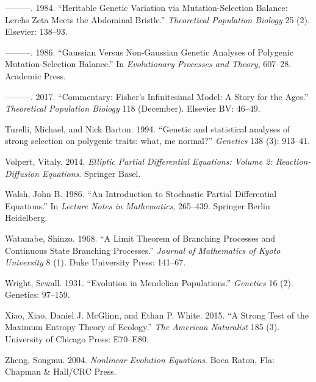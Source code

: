 \documentclass[]{article}
\begin{document}
\leavevmode\hypertarget{ref-Turelli1984}{}%
---------. 1984. ``Heritable Genetic Variation via Mutation-Selection
Balance: Lerchs Zeta Meets the Abdominal Bristle.'' \emph{Theoretical
Population Biology} 25 (2). Elsevier: 138--93.

\leavevmode\hypertarget{ref-Turelli1986}{}%
---------. 1986. ``Gaussian Versus Non-Gaussian Genetic Analyses of
Polygenic Mutation-Selection Balance.'' In \emph{Evolutionary Processes
and Theory}, 607--28. Academic Press.

\leavevmode\hypertarget{ref-Turelli2017}{}%
---------. 2017. ``Commentary: Fisher's Infinitesimal Model: A Story for
the Ages.'' \emph{Theoretical Population Biology} 118 (December).
Elsevier BV: 46--49.

\leavevmode\hypertarget{ref-pmid7851785}{}%
Turelli, Michael, and Nick Barton. 1994. ``Genetic and statistical
analyses of strong selection on polygenic traits: what, me normal?''
\emph{Genetics} 138 (3): 913--41.

\leavevmode\hypertarget{ref-Volpert2014}{}%
Volpert, Vitaly. 2014. \emph{Elliptic Partial Differential Equations:
Volume 2: Reaction-Diffusion Equations}. Springer Basel.

\leavevmode\hypertarget{ref-Walsh}{}%
Walsh, John B. 1986. ``An Introduction to Stochastic Partial
Differential Equations.'' In \emph{Lecture Notes in Mathematics},
265--439. Springer Berlin Heidelberg.

\leavevmode\hypertarget{ref-Watanabe1968}{}%
Watanabe, Shinzo. 1968. ``A Limit Theorem of Branching Processes and
Continuous State Branching Processes.'' \emph{Journal of Mathematics of
Kyoto University} 8 (1). Duke University Press: 141--67.

\leavevmode\hypertarget{ref-Wright97}{}%
Wright, Sewall. 1931. ``Evolution in Mendelian Populations.''
\emph{Genetics} 16 (2). Genetics: 97--159.

\leavevmode\hypertarget{ref-Xiao2015}{}%
Xiao, Xiao, Daniel J. McGlinn, and Ethan P. White. 2015. ``A Strong Test
of the Maximum Entropy Theory of Ecology.'' \emph{The American
Naturalist} 185 (3). University of Chicago Press: E70--E80.

\leavevmode\hypertarget{ref-zheng2004nonlinear}{}%
Zheng, Songmu. 2004. \emph{Nonlinear Evolution Equations}. Boca Raton,
Fla: Chapman \& Hall/CRC Press.
\end{document}

